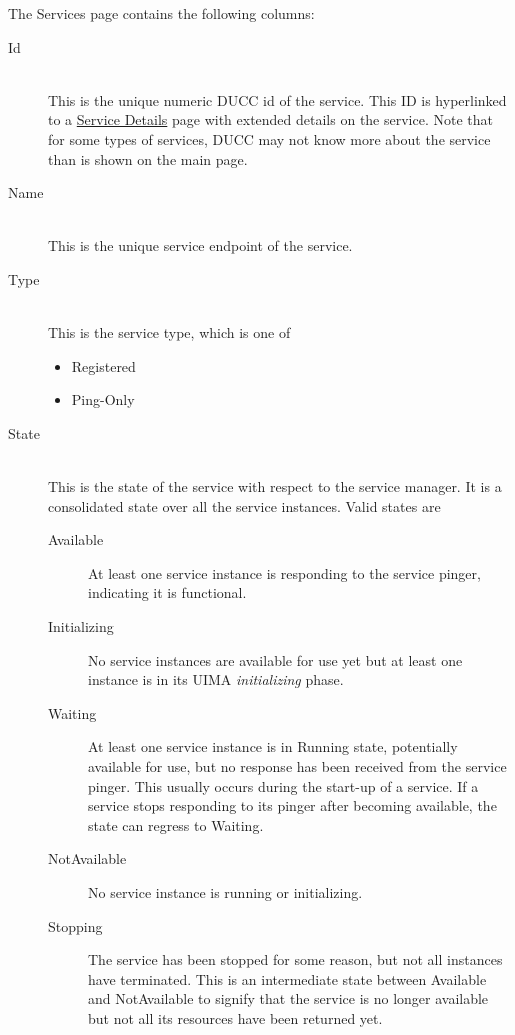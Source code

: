         The Services page contains the following columns: 
        \begin{description}

            \item[Id] \hfill \\
              This is the unique numeric DUCC id of the service.  This ID is hyperlinked to a
              \hyperref[sec:ws-service-details]{Service Details} page with extended
              details on the service.  Note that for some types of services, DUCC may not
              know more about the service than is shown on the main page.

            \item[Name] \hfill \\
              This is the unique service endpoint of the service.  
              
            \item[Type] \hfill \\
              This is the service type, which is one of
              \begin{itemize}
                \item Registered
                \item Ping-Only
              \end{itemize}
              
            \item[State] \hfill \\
              This is the state of the service with respect to the service manager.  It is a
              consolidated state over all the service instances.  Valid states are
              \begin{description}
                \item[Available] At least one service instance is responding to the service
                  pinger, indicating it is functional.
                \item[Initializing] No service instances are available for use yet but at least one instance
                  is in its UIMA {\em initializing} phase.
                \item[Waiting] At least one service instance is in Running state, potentially available for use,
                  but no response has been received from the service pinger.  This usually occurs during the
                  start-up of a service.  If a service stops responding to its pinger after becoming
                  available, the state can regress to Waiting.
                \item[NotAvailable] No service instance is running or initializing. 
                \item[Stopping] The service has been stopped for some reason, but not all 
                  instances have terminated.  This is an intermediate state between Available and
                  NotAvailable to signify that the service is no longer available but not all its
                  resources have been returned yet.
              \end{description}


\end{description}
